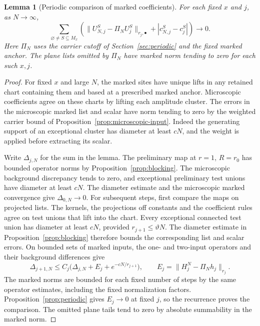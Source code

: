 \documentclass[11pt]{article}
\newtheorem{lemma}[proposition]{Lemma}
\theoremstyle{definition}
\begin{document}
\begin{lemma}[Periodic comparison of marked coefficients]
\label{lem:periodic-marks}
For each fixed \(x\) and \(j\), as \(N\to\infty\),
\[
 \sum_{\varnothing\ne S\subseteq M_x}
 \left(\|U_{N,j}^S-\Pi_N U_j^S\|_{r_j,\bullet}
              +|c_{N,j}^S-c_j^S|\right)\longrightarrow0 .
\]
Here \(\Pi_N\) uses the carrier cutoff of
Section~\ref{sec:periodic} and the fixed marked anchor.
The plane lists omitted by \(\Pi_N\) have marked norm tending
to zero for each such \(x,j\).
\end{lemma}

\begin{proof}
For fixed \(x\) and large \(N\), the marked sites have unique lifts
in any retained chart containing them and based at a prescribed
marked anchor. Microscopic coefficients agree on these charts by
lifting each amplitude cluster. The errors in the microscopic
marked list and scalar have norm tending to zero by the weighted
carrier bound of Proposition~\ref{prop:microscopic-input}.
Indeed the generating support of an exceptional cluster has
diameter at least \(cN\), and the weight is applied before
extracting its scalar.

Write \(\Delta_{j,N}\) for the sum in the lemma. The preliminary
map at \(r=1\), \(R=r_0\) has bounded operator norms by
Proposition~\ref{prop:blocking}. The microscopic background
discrepancy tends to zero, and exceptional preliminary test unions
have diameter at least \(cN\). The diameter estimate and the
microscopic marked convergence give \(\Delta_{0,N}\to0\).
For subsequent steps, first compare the maps on projected lists.
The kernels, the projections off constants and the coefficient rules agree
on test unions that lift into the chart. Every exceptional
connected test union has diameter at least \(cN\), provided
\(r_{j+1}\le\vartheta N\). The diameter estimate in
Proposition~\ref{prop:blocking} therefore bounds the corresponding
list and scalar errors. On bounded sets of marked inputs,
the one- and two-input operators and their background differences
give
\[
 \Delta_{j+1,N}\le
 C_j\bigl(\Delta_{j,N}+E_j+e^{-cN/r_{j+1}}\bigr),
 \qquad E_j=\|H_j^N-\Pi_N h_j\|_{r_j}.
\]
The marked norms are bounded for each fixed number of steps
by the same operator estimates, including the fixed normalization
factors. Proposition~\ref{prop:periodic} gives \(E_j\to0\) at
fixed \(j\), so the recurrence proves the comparison. The
omitted plane tails tend to zero by absolute summability
in the marked norm.
\end{proof}
\end{document}
